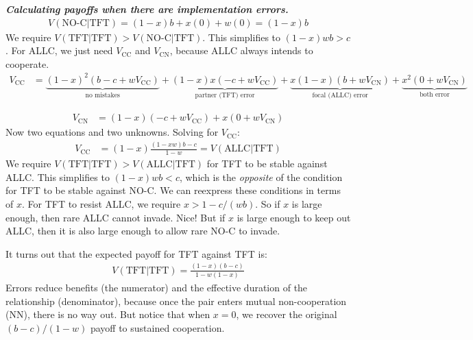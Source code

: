 \documentclass[10pt,reqno]{amsbook}
\numberwithin{equation}{chapter}
\newenvironment{mathbox}[2]
{\begin{table}[#1]
\justify\begin{tcolorbox}[enhanced, oversize]\footnotesize\noindent\textbf{\emph{#2}}}
{\end{tcolorbox}\end{table}}
\begin{document}
\begin{mathbox}{p}{Calculating payoffs when there are implementation errors.}
\begin{align*}
	V(\text{NO-C}|\text{TFT}) = (1-x)b + x(0) + w(0) = (1-x)b
\end{align*}
We require $V(\text{TFT}|\text{TFT}) > V(\text{NO-C}|\text{TFT})$. This simplifies to $(1-x)wb>c$. For ALLC, we just need $V_\text{CC}$ and $V_\text{CN}$, because ALLC always intends to cooperate.
\begin{align*}
	V_\text{CC} &= \underbrace{(1-x)^2(b-c+wV_\text{CC})}_\text{no mistakes}
	+ \underbrace{(1-x)x(-c+wV_\text{CC})}_\text{partner (TFT) error}
	+ \underbrace{x(1-x)(b+wV_\text{CN})}_\text{focal (ALLC) error}
	+ \underbrace{x^2(0 + wV_\text{CN})}_\text{both error}
\end{align*}

\begin{align*}
	V_\text{CN} &= (1-x)(-c + w V_\text{CC}) + x(0+w V_\text{CN})
\end{align*}
Now two equations and two unknowns. Solving for $V_\text{CC}$:
\begin{align*}
	V_\text{CC} &= (1-x)\frac{(1-xw)b-c}{1-w} = V(\text{ALLC}|\text{TFT})
\end{align*}
We require $V(\text{TFT}|\text{TFT}) > V(\text{ALLC}|\text{TFT})$ for TFT to be stable against ALLC. This simplifies to $(1-x)wb < c$, which is the \emph{opposite} of the condition for TFT to be stable against NO-C. We can reexpress these conditions in terms of $x$. For TFT to resist ALLC, we require $x > 1-c/(wb)$. So if $x$ is large enough, then rare ALLC cannot invade. Nice! But if $x$ is large enough to keep out ALLC, then it is also large enough to allow rare NO-C to invade. %

\end{mathbox}

It turns out that the expected payoff for TFT against TFT is:
\begin{align*}
	V(\text{TFT}|\text{TFT}) = \frac{(1-x)(b-c)}{1-w(1-x)}
\end{align*}
Errors reduce benefits (the numerator) and the effective duration of the relationship (denominator), because once the pair enters mutual non-cooperation (NN), there is no way out. But notice that when $x=0$, we recover the original $(b-c)/(1-w)$ payoff to sustained cooperation.
\end{document}
